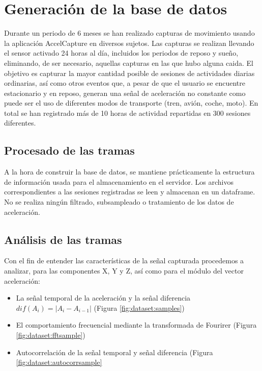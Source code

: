 \section{Generación de la base de datos}

Durante un periodo de 6 meses se han realizado capturas de movimiento usando la aplicación AccelCapture en diversos sujetos. Las capturas se realizan llevando el sensor activado 24 horas al día, incluidos los periodos de reposo y sueño, eliminando, de ser necesario, aquellas capturas en las que hubo alguna caida. El objetivo es capturar la mayor cantidad posible de sesiones de actividades diarias ordinarias, así como otros eventos que, a pesar de que el usuario se encuentre estacionario y en reposo, generan una señal de aceleración no constante como puede ser el uso de diferentes modos de transporte (tren, avión, coche, moto). En total se han registrado más de 10 horas de actividad repartidas en 300 sesiones diferentes.

\subsection{Procesado de las tramas}

A la hora de construir la base de datos, se mantiene prácticamente la estructura de información usada para el almacenamiento en el servidor. Los archivos correspondientes a las sesiones registradas se leen y almacenan en un dataframe. No se realiza ningún filtrado, subsampleado o tratamiento de los datos de aceleración.

\subsection{Análisis de las tramas}

Con el fin de entender las características de la señal capturada procedemos a analizar, para las componentes X, Y y Z, así como para el módulo del vector aceleración:
\begin{itemize}
  \item La señal temporal de la aceleración y la señal diferencia $dif(A_i) = |A_i - A_{i-1}|$
    (Figura \ref{fig:dataset:samples})
  \item El comportamiento frecuencial mediante la transformada de Fourirer (Figura \ref{fig:dataset:fftsample})
  \item Autocorrelación de la señal temporal y señal diferencia (Figura \ref{fig:dataset:autocorrsample}
\end{itemize}


